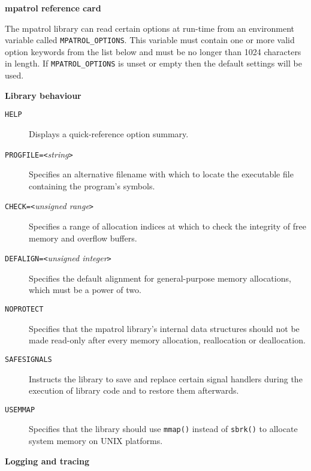 \documentclass[a4paper,landscape,final]{article}
\newcommand{\heading}[1]{\textbf{\normalsize #1}}
\newcommand{\function}[1]{\texttt{#1()}}
\newcommand{\option}[1]{\texttt{#1}}
\newcommand{\optionpar}[2]{\option{#1}\texttt{=<}\textit{#2}\texttt{>}}
\begin{document}
\pagestyle{empty}

\footnotesize

\begin{multicols}{3}{\textbf{\Large mpatrol reference card}}

\vskip 12pt

The mpatrol library can read certain options at run-time from an environment
variable called \texttt{MPATROL\_OPTIONS}.  This variable must contain one or
more valid option keywords from the list below and must be no longer than 1024
characters in length.  If \texttt{MPATROL\_OPTIONS} is unset or empty then the
default settings will be used.

\vskip 12pt
\heading{Library behaviour}
\vskip 6pt

\begin{description}
\item[\option{HELP}]
Displays a quick-reference option summary.
\item[\optionpar{PROGFILE}{string}]
Specifies an alternative filename with which to locate the executable file
containing the program's symbols.
\item[\optionpar{CHECK}{unsigned range}]
Specifies a range of allocation indices at which to check the integrity of free
memory and overflow buffers.
\item[\optionpar{DEFALIGN}{unsigned integer}]
Specifies the default alignment for general-purpose memory allocations, which
must be a power of two.
\item[\option{NOPROTECT}]
Specifies that the mpatrol library's internal data structures should not be made
read-only after every memory allocation, reallocation or deallocation.
\item[\option{SAFESIGNALS}]
Instructs the library to save and replace certain signal handlers during the
execution of library code and to restore them afterwards.
\item[\option{USEMMAP}]
Specifies that the library should use \function{mmap} instead of \function{sbrk}
to allocate system memory on UNIX platforms.
\end{description}

\vskip 12pt
\heading{Logging and tracing}
\vskip 6pt


\end{multicols}
\end{document}

